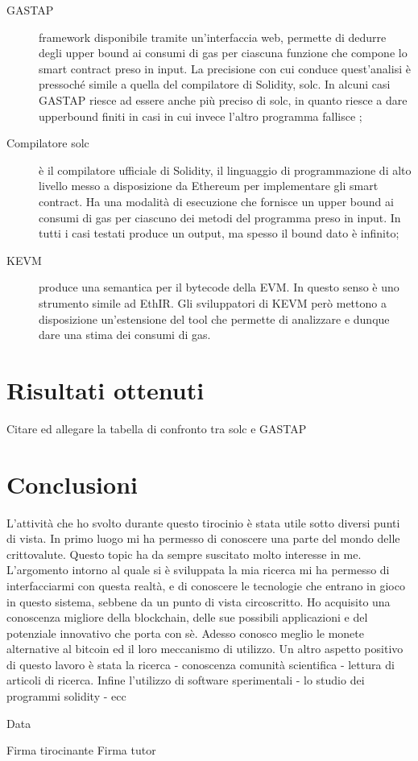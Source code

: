\documentclass[a4paper,10pt]{article}
\begin{document}
\begin{description} %
  \item[GASTAP] framework disponibile tramite un'interfaccia web, permette di dedurre degli upper bound ai consumi di gas per ciascuna funzione che compone lo smart contract preso in input. La precisione con cui conduce quest'analisi è pressoché simile a quella del compilatore di Solidity, solc. In alcuni casi GASTAP riesce ad essere anche più preciso di solc, in quanto riesce a dare upperbound finiti in casi in cui invece l'altro programma fallisce ;
  \item[Compilatore solc] è il compilatore ufficiale di Solidity, il linguaggio di programmazione di alto livello messo a disposizione da Ethereum per implementare gli smart contract. Ha una modalità di esecuzione che fornisce un upper bound ai consumi di gas per ciascuno dei metodi del programma preso in input. In tutti i casi testati produce un output, ma spesso il bound dato è infinito;
  \item[KEVM] produce una semantica per il bytecode della EVM. In questo senso è uno strumento simile ad EthIR. Gli sviluppatori di KEVM però mettono a disposizione un'estensione del tool che permette di analizzare e dunque dare una stima dei consumi di gas.
\end{description}

\section{Risultati ottenuti}

Citare ed allegare la tabella di confronto tra solc e GASTAP

\section{Conclusioni}

L'attività che ho svolto durante questo tirocinio è stata utile sotto diversi punti di vista.\newline
In primo luogo mi ha permesso di conoscere una parte del mondo delle crittovalute. Questo topic ha da sempre suscitato molto interesse in me. L'argomento intorno al quale si è sviluppata la mia ricerca mi ha permesso di interfacciarmi con questa realtà, e di conoscere le tecnologie che entrano in gioco in questo sistema, sebbene da un punto di vista circoscritto. Ho acquisito una  conoscenza migliore della blockchain, delle sue possibili applicazioni e del potenziale innovativo che porta con sè. Adesso conosco meglio le monete alternative al bitcoin ed il loro meccanismo di utilizzo.\newline
Un altro aspetto positivo di questo lavoro è stata la ricerca - conoscenza comunità scientifica - lettura di articoli di ricerca.
Infine l'utilizzo di software sperimentali - lo studio dei programmi solidity - ecc

\vspace{30mm}

\par
\noindent
\begin{minipage}[t]{0.47\textwidth}
{\large{Data}}
\end{minipage}
\hfill
\begin{minipage}[t]{0.47\textwidth}\raggedleft
{\large{Firma tirocinante\newline
\newline
\newline
Firma tutor\newline}}
\end{minipage}
\end{document}
